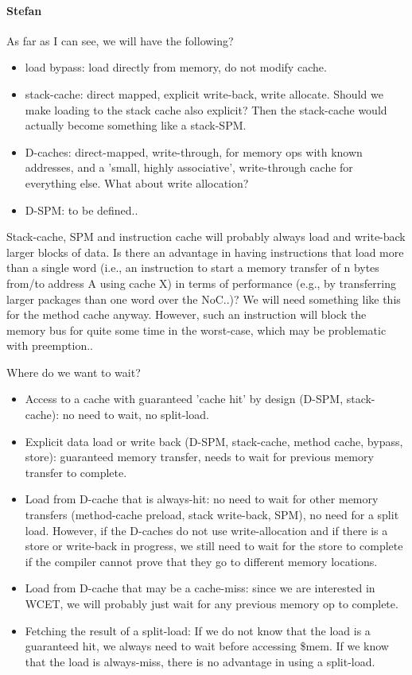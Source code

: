 \documentclass{IEEEtran}
\newcommand{\comment}[3]{\paragraph*{\textbf{#1}}{\color{#3}#2}}
\newcommand{\stefan}[1]{\comment{Stefan}{#1}{RoyalPurple}}
\begin{document}
\stefan{As far as I can see, we will have the following?
\begin{itemize}
\item load bypass: load directly from memory, do not modify cache.
\item stack-cache: direct mapped, explicit write-back, write allocate. Should we make loading to the stack cache also explicit?
  Then the stack-cache would actually become something like a stack-SPM.
\item D-caches: direct-mapped, write-through, for memory ops with known addresses, and a 'small, highly associative', write-through cache for
everything else. What about write allocation?
\item D-SPM: to be defined..
\end{itemize}

Stack-cache, SPM and instruction cache will probably always load and write-back larger blocks of data. Is there an advantage in having
instructions that load more than a single word (i.e., an instruction to start a memory transfer of n bytes from/to address A using cache X)
in terms of performance (e.g., by transferring larger packages than one word over the NoC..)? We will need something like this for the
method cache anyway. However, such an instruction will block the memory bus for quite some time in the worst-case, which may be problematic with
preemption..

Where do we want to wait?
\begin{itemize}
\item Access to a cache with guaranteed 'cache hit' by design (D-SPM, stack-cache): no need to wait, no split-load.
\item Explicit data load or write back (D-SPM, stack-cache, method cache, bypass, store): guaranteed memory transfer, needs to wait for previous
memory transfer to complete.
\item Load from D-cache that is always-hit: no need to wait for other memory transfers (method-cache preload, stack write-back, SPM),
no need for a split load. However, if the D-caches do not use write-allocation and if there is a store or write-back in progress, we still need to wait
for the store to complete if the compiler cannot prove that they go to different memory locations.
\item Load from D-cache that may be a cache-miss: since we are interested in WCET, we will probably just wait for any previous memory op to
complete.
\item Fetching the result of a split-load: If we do not know that the load is a guaranteed hit, we always need to wait before accessing
\$mem. If we know that the load is always-miss, there is no advantage in using a split-load.
\end{itemize}
}
\end{document}
